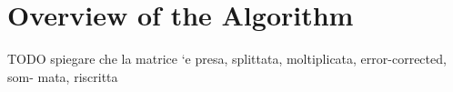 \section{Overview of the Algorithm}
\label{sec:overview}

TODO spiegare che la matrice `e presa, splittata, moltiplicata, error-corrected, som-
mata, riscritta
